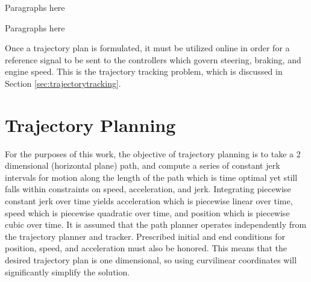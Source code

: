\documentclass[letterpaper, 10 pt, conference]{ieeeconf}  %
\begin{document}


% 

Paragraphs here

Paragraphs here

Once a trajectory plan is formulated, it must be utilized online in order for a reference signal to be sent to the controllers which govern steering, braking, and engine speed.
This is the trajectory tracking problem, which is discussed in Section \ref{sec:trajectorytracking}.


\section{Trajectory Planning}
\label{sec:trajectoryplanning}

For the purposes of this work, the objective of trajectory planning is to take a 2 dimensional (horizontal plane) path, and compute a series of constant jerk intervals for motion along the length of the path which is time optimal yet still falls within constraints on speed, acceleration, and jerk.
Integrating piecewise constant jerk over time yields acceleration which is piecewise linear over time, speed which is piecewise quadratic over time, and position which is piecewise cubic over time.
It is assumed that the path planner operates independently from the trajectory planner and tracker.
Prescribed initial and end conditions for position, speed, and acceleration must also be honored. 
This means that the desired trajectory plan is one dimensional, so using curvilinear coordinates will significantly simplify the solution.

\end{document}

